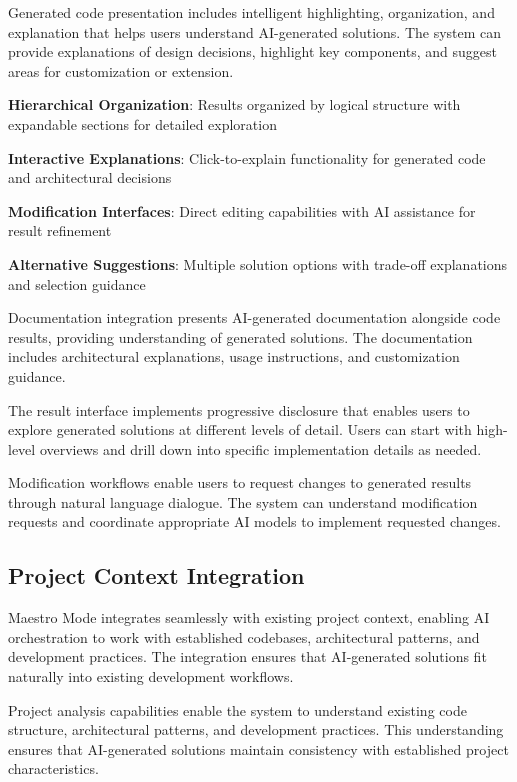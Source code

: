 Generated code presentation includes intelligent highlighting, organization, and explanation that helps users understand AI-generated solutions. The system can provide explanations of design decisions, highlight key components, and suggest areas for customization or extension.

\begin{expandedlist}
    \item \textbf{Hierarchical Organization}: Results organized by logical structure with expandable sections for detailed exploration
    \item \textbf{Interactive Explanations}: Click-to-explain functionality for generated code and architectural decisions
    \item \textbf{Modification Interfaces}: Direct editing capabilities with AI assistance for result refinement
    \item \textbf{Alternative Suggestions}: Multiple solution options with trade-off explanations and selection guidance
\end{expandedlist}

Documentation integration presents AI-generated documentation alongside code results, providing understanding of generated solutions. The documentation includes architectural explanations, usage instructions, and customization guidance.

The result interface implements progressive disclosure that enables users to explore generated solutions at different levels of detail. Users can start with high-level overviews and drill down into specific implementation details as needed.

Modification workflows enable users to request changes to generated results through natural language dialogue. The system can understand modification requests and coordinate appropriate AI models to implement requested changes.

\subsection*{Project Context Integration}

Maestro Mode integrates seamlessly with existing project context, enabling AI orchestration to work with established codebases, architectural patterns, and development practices. The integration ensures that AI-generated solutions fit naturally into existing development workflows.

Project analysis capabilities enable the system to understand existing code structure, architectural patterns, and development practices. This understanding ensures that AI-generated solutions maintain consistency with established project characteristics.

